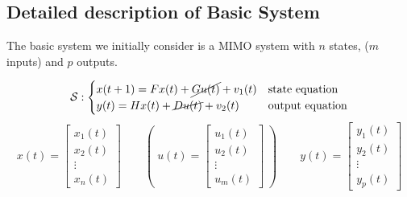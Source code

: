 \subsection{Detailed description of Basic System}

The basic system we initially consider is a MIMO system with $n$ states, ($m$ inputs) and $p$ outputs.

\[
    \mathcal{S}: \begin{cases}
        x(t+1) = Fx(t) + \cancel{Gu(t)} + v_1(t) & \text{state equation}\\
        y(t) = Hx(t) + \cancel{Du(t)} + v_2(t) & \text{output equation}
    \end{cases}
\]
\[
    x(t) = \begin{bmatrix}
        x_1(t) \\
        x_2(t) \\
        \vdots \\
        x_n(t)
    \end{bmatrix}
    \qquad
    \left(\;u(t) = \begin{bmatrix}
        u_1(t) \\
        u_2(t) \\
        \vdots \\
        u_m(t)
    \end{bmatrix}\;\right)
    \qquad
    y(t) = \begin{bmatrix}
        y_1(t) \\
        y_2(t) \\
        \vdots \\
        y_p(t)
    \end{bmatrix}
\]

